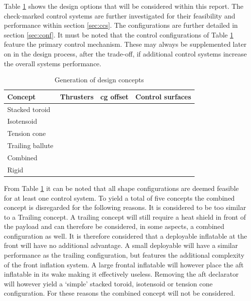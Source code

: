 Table \ref{tab:designconcepts} shows the design options that will be considered within this report. The check-marked control systems are further investigated for their feasibility and performance within section \ref{sec:ccs}. The configurations are further detailed in section \ref{sec:conf}. It must be noted that the control configurations of Table \ref{tab:designconcepts} feature the primary control mechanism. These may always be supplemented later on in the design process, after the trade-off, if additional control systems increase the overall systems performance. 

\begin{table}[H]
	\caption{Generation of design concepts}
	\label{tab:designconcepts}
	\centering
		\begin{tabular}{|p{}|p{}|p{}|p{}|} \hline 
			\textbf{Concept} & \textbf{Thrusters}	& \textbf{\gls{cg} offset} &  \textbf{Control surfaces} \\ \hline \hline
			Stacked toroid   & \cmark	& \cmark &  \cmark \\ \hline
			Isotensoid		 & \cmark	& \cmark &  \xmark\\  \hline
			Tension cone	 & \cmark	& \cmark &  \cmark \\ \hline
			Trailing ballute & \xmark	& \xmark &  \cmark \\ \hline
			Combined 		 & \xmark	& \xmark &  \cmark \\ \hline
			Rigid  		   	 & \cmark	& \cmark &  \cmark \\ \hline
		\end{tabular}
\end{table}

From Table \ref{tab:designconcepts} it can be noted that all shape configurations are deemed feasible for at least one control system. To yield a total of five concepts the combined concept is disregarded for the following reasons. It is considered to be too similar to a Trailing concept. A trailing concept will still require a heat shield in front of the payload and can therefore be considered, in some aspects, a combined configuration as well. It is therefore considered that a deployable inflatable at the front will have no additional advantage. A small deployable will have a similar performance as the trailing configuration, but features the additional complexity of the front inflation system. A large frontal inflatable will however place the aft inflatable in its wake making it effectively useless. Removing the aft declarator will however yield a `simple' stacked toroid, isotensoid or tension cone configuration. For these reasons the combined concept will not be considered. 
 
